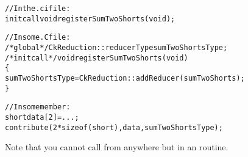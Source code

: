 \begin{alltt}
//In the .ci file:
  initcall void registerSumTwoShorts(void);

//In some .C file:
/*global*/ CkReduction::reducerType sumTwoShortsType;
/*initcall*/ void registerSumTwoShorts(void)
\{
  sumTwoShortsType=CkReduction::addReducer(sumTwoShorts);
\}

//In some member:
  short data[2]=...;
  contribute(2*sizeof(short),data,sumTwoShortsType);
\end{alltt}

Note that you cannot call 
from anywhere but in an  routine.


